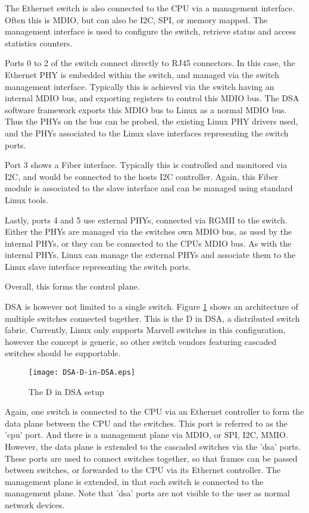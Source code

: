 \documentclass[letterpaper]{article}
\begin{document}
The Ethernet switch is also connected to the CPU via a management
interface. Often this is MDIO, but can also be I2C, SPI, or memory
mapped. The management interface is used to configure the switch,
retrieve status and access statistics counters.

Ports 0 to 2 of the switch connect directly to RJ45 connectors. In
this case, the Ethernet PHY is embedded within the switch, and managed
via the switch management interface. Typically this is achieved via
the switch having an internal MDIO bus, and exporting registers to
control this MDIO bus. The DSA software framework exports this MDIO
bus to Linux as a normal MDIO bus. Thus the PHYs on the bus can be
probed, the existing Linux PHY drivers used, and the PHYs associated
to the Linux slave interfaces representing the switch ports.

Port 3 shows a Fiber interface. Typically this is controlled and
monitored via I2C, and would be connected to the hosts I2C
controller. Again, this Fiber module is associated to the slave
interface and can be managed using standard Linux tools.

Lastly, ports 4 and 5 use external PHYs, connected via RGMII to the
switch. Either the PHYs are managed via the switches own MDIO bus, as
used by the internal PHYs, or they can be connected to the CPUs MDIO
bus. As with the internal PHYs, Linux can manage the external PHYs and
associate them to the Linux slave interface representing the switch
ports.

Overall, this forms the control plane.

DSA is however not limited to a single switch. Figure \ref{d-in-dsa}
shows an architecture of multiple switches connected together. This is
the D in DSA, a distributed switch fabric. Currently, Linux only supports
Marvell switches in this configuration, however the concept is
generic, so other switch vendors featuring cascaded switches should be
supportable.

\begin{figure}[ht]
  \centering
  \texttt{[image: DSA-D-in-DSA.eps]}
  \caption{The D in DSA setup}
  \label{d-in-dsa}
\end{figure}

Again, one switch is connected to the CPU via an Ethernet controller
to form the data plane between the CPU and the switches. This port is
referred to as the 'cpu' port. And there is a management plane via
MDIO, or SPI, I2C, MMIO. However, the data plane is extended to the
cascaded switches via the 'dsa' ports. These ports are used to connect
switches together, so that frames can be passed between switches, or
forwarded to the CPU via its Ethernet controller. The management plane
is extended, in that each switch is connected to the management plane.
Note that 'dsa' ports are not visible to the user as normal network
devices.
\end{document}
